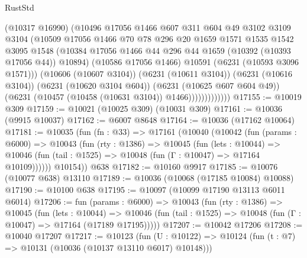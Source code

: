 \begin{lexlean}{RustStd}
\begin{coremodule}
{{                        (@10317 @16990)
                        (@10496
                          @17056
                          @1466
                          @607
                          @311
                          @604
                          @49
                          @3102
                          @3109
                          @3104
                          (@10509
                            @17056
                            @1466
                            @70
                            @78
                            @296
                            @20
                            @1659
                            @1571
                            @1535
                            @1542
                            @3095
                            @1548
                            (@10384
                              @17056
                              @1466
                              @44
                              @296
                              @44
                              @1659
                              (@10392 (@10393 @17056 @44))
                              @10894)
                            (@10586 @17056 @1466)
                            @10591
                            (@6231 (@10593 @3096 @1571)))
                          (@10606 (@10607 @3104))
                          (@6231 (@10611 @3104))
                          (@6231 (@10616 @3104))
                          (@6231 (@10620 @3104 @604))
                          (@6231 (@10625 @607 @604 @49))
                          (@6231 (@10457 (@10458 (@10631 @3104)) @1466)))))))))))))
@17155 := @10019 @309
@17159 := @10021 (@10025 @309) (@10031 @309)
@17161 := @10036 (@9915 @10037)
@17162 := @6007 @8648
@17164 := @10036 (@17162 @10064)
@17181 := @10035
    (fun (fn : @33) =>
    @17161
      (@10040
        (@10042
          (fun (params : @6000) =>
          @10043
            (fun (rty : @1386) =>
            @10045
              (fun (lets : @10044) =>
              @10046 (fun (tail : @1525) => @10048 (fun (Γ : @10047) => @17164 @10109))))))
        @10154))
    @638
@17182 := @10160 @9917
@17185 := @10076 (@10077 @638) @13110
@17189 := @10036 (@10068 (@17185 @10084) @10088)
@17190 := @10100 @638
@17195 := @10097 (@10099 @17190 @13113 @6011 @6014)
@17206 := fun (params : @6000) =>
  @10043
    (fun (rty : @1386) =>
    @10045
      (fun (lets : @10044) =>
      @10046 (fun (tail : @1525) => @10048 (fun (Γ : @10047) => @17164 (@17189 @17195)))))
@17207 := @10042 @17206
@17208 := @10040 @17207
@17217 := @10123
    (fun (U : @10122) => @10124 (fun (t : @7) => @10131 (@10036 (@10137 @13110 @6017) @10148)))
}}
\end{coremodule}
\end{lexlean}
